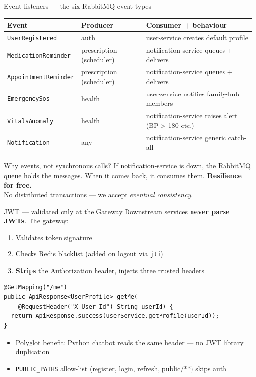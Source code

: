 \documentclass[aspectratio=169,11pt]{beamer}
\begin{document}
\begin{frame}{Event listeners --- the six RabbitMQ event types}
  \footnotesize
  \begin{tabular}{ll p{6.5cm}}
    \toprule
    \textbf{Event} & \textbf{Producer} & \textbf{Consumer + behaviour} \\
    \midrule
    \texttt{UserRegistered}   & auth & user-service creates default profile \\
    \texttt{MedicationReminder} & prescription (scheduler) & notification-service queues + delivers \\
    \texttt{AppointmentReminder} & prescription (scheduler) & notification-service queues + delivers \\
    \texttt{EmergencySos}     & health  & user-service notifies family-hub members \\
    \texttt{VitalsAnomaly}    & health  & notification-service raises alert (BP > 180 etc.) \\
    \texttt{Notification}     & any     & notification-service generic catch-all \\
    \bottomrule
  \end{tabular}
  \vfill
  \begin{exampleblock}{Why events, not synchronous calls?}
    \small If notification-service is down, the RabbitMQ queue holds the messages. When it comes back, it consumes them. \textbf{Resilience for free.}\\
    No distributed transactions --- we accept \emph{eventual consistency}.
  \end{exampleblock}
\end{frame}

\begin{frame}[fragile]{JWT --- validated only at the Gateway}
  Downstream services \textbf{never parse JWTs}. The gateway:
  \begin{enumerate}\small
    \item Validates token signature
    \item Checks Redis blacklist (added on logout via \texttt{jti})
    \item \textbf{Strips} the Authorization header, injects three trusted headers
  \end{enumerate}
  \vspace{2pt}
  \begin{lstlisting}[basicstyle=\ttfamily\scriptsize, frame=single, framerule=0.4pt]
@GetMapping("/me")
public ApiResponse<UserProfile> getMe(
    @RequestHeader("X-User-Id") String userId) {
  return ApiResponse.success(userService.getProfile(userId));
}
  \end{lstlisting}
  \vfill
  \begin{itemize}\small
    \item Polyglot benefit: Python chatbot reads the same header --- no JWT library duplication
    \item \texttt{PUBLIC\_PATHS} allow-list (register, login, refresh, public/**) skips auth
  \end{itemize}
\end{frame}
\end{document}
